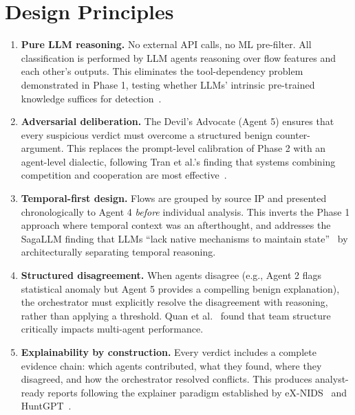 \documentclass[12pt, a4paper, oneside]{report}
\begin{document}
\section{Design Principles}

\begin{enumerate}
  \item \textbf{Pure LLM reasoning.} No external API calls, no ML pre-filter.
        All classification is performed by LLM agents reasoning over flow
        features and each other's outputs. This eliminates the tool-dependency
        problem demonstrated in Phase 1, testing whether LLMs' intrinsic
        pre-trained knowledge suffices for detection~\cite{houssel2024towards}.

  \item \textbf{Adversarial deliberation.} The Devil's Advocate (Agent 5)
        ensures that every suspicious verdict must overcome a structured benign
        counter-argument. This replaces the prompt-level calibration of Phase 2
        with an agent-level dialectic, following Tran et al.'s finding that
        systems combining competition and cooperation are most
        effective~\cite{tran2025collaboration}.

  \item \textbf{Temporal-first design.} Flows are grouped by source IP and
        presented chronologically to Agent 4 \emph{before} individual analysis.
        This inverts the Phase 1 approach where temporal context was an
        afterthought, and addresses the SagaLLM finding that LLMs ``lack native
        mechanisms to maintain state''~\cite{sagallm2025} by architecturally
        separating temporal reasoning.

  \item \textbf{Structured disagreement.} When agents disagree (e.g., Agent 2
        flags statistical anomaly but Agent 5 provides a compelling benign
        explanation), the orchestrator must explicitly resolve the disagreement
        with reasoning, rather than applying a threshold. Quan et
        al.~\cite{quan2024collaboration} found that team structure critically
        impacts multi-agent performance.

  \item \textbf{Explainability by construction.} Every verdict includes a
        complete evidence chain: which agents contributed, what they found,
        where they disagreed, and how the orchestrator resolved conflicts.
        This produces analyst-ready reports following the explainer paradigm
        established by eX-NIDS~\cite{houssel2025exnids} and
        HuntGPT~\cite{ali2023huntgpt}.
\end{enumerate}
\end{document}
